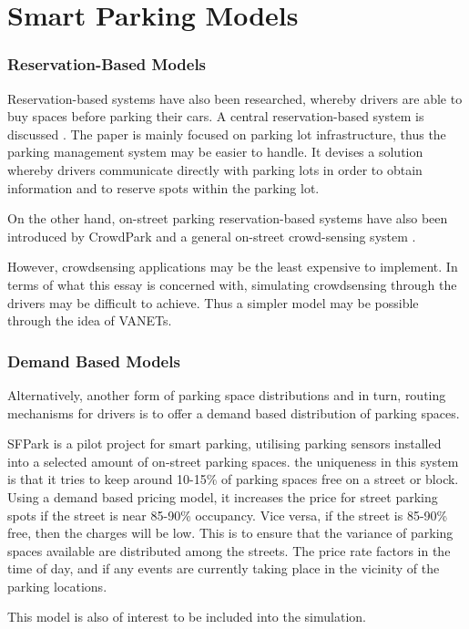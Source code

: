 \section{Smart Parking Models}
\subsubsection{Reservation-Based Models}
Reservation-based systems have also been researched, whereby drivers are able to buy spaces before parking their cars. A central reservation-based system is discussed \citep{2}. The paper is mainly focused on parking lot infrastructure, thus the parking management system may be easier to handle. It devises a solution whereby drivers communicate directly with parking lots in order to obtain information and to reserve spots within the parking lot.

On the other hand, on-street parking reservation-based systems have also been introduced by CrowdPark \citep{8} and a general on-street crowd-sensing system \citep{9}.

However, crowdsensing applications may be the least expensive to implement. In terms of what this essay is concerned with, simulating crowdsensing through the drivers may be difficult to achieve. Thus a simpler model may be possible through the idea of VANETs.

\subsubsection{Demand Based Models}
Alternatively, another form of parking space distributions and in turn, routing mechanisms for drivers is to offer a demand based distribution of parking spaces.

SFPark \citep{12} is a pilot project for smart parking, utilising parking sensors installed into a selected amount of on-street parking spaces. the uniqueness in this system is that it tries to keep around 10-15\% of parking spaces free on a street or block. Using a demand based pricing model, it increases the price for street parking spots if the street is near 85-90\% occupancy. Vice versa, if the street is 85-90\% free, then the charges will be low. This is to ensure that the variance of parking spaces available are distributed among the streets. The price rate factors in the time of day, and if any events are currently taking place in the vicinity of the parking locations.

This model is also of interest to be included into the simulation.